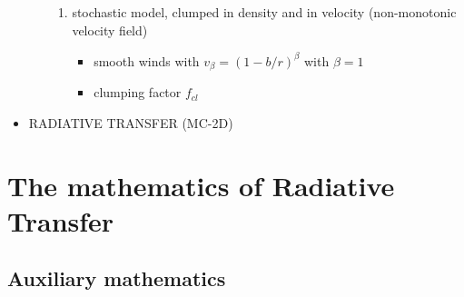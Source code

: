 \documentclass[10pt,a4paper]{article}
\begin{document}
\begin{itemize}
\begin{itemize}
\begin{enumerate}
\item stochastic model, clumped in density and in velocity (non-monotonic velocity field)
\begin{itemize}
\item smooth winds with $v_{\beta} = (1-b/r)^{\beta}$ with $\beta = 1$
\item clumping factor $f_{cl}$
\end{itemize}
\end{enumerate}

\end{itemize}

\item RADIATIVE TRANSFER (MC-2D)

\end{itemize}



\newpage
\section{The mathematics of Radiative Transfer}
\subsection{Auxiliary mathematics}
\end{document}
